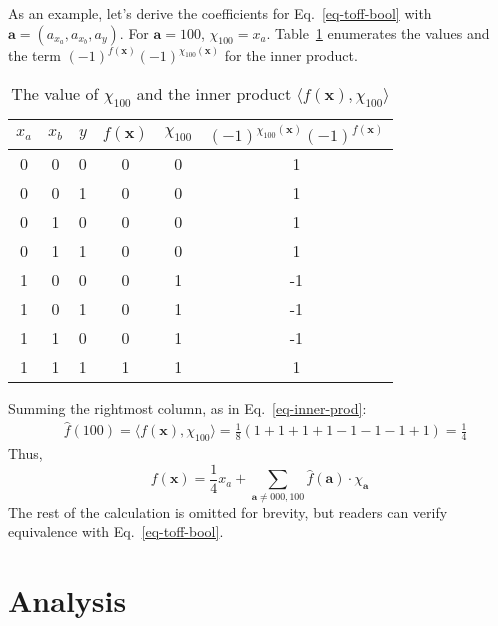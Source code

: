 \documentclass[a4paper]{article}
\begin{document}
\begin{example}
As an example, let's derive the coefficients for Eq.~\ref{eq-toff-bool} with $\mathbf{a} = (a_{x_a}, a_{x_b}, a_y)$.
For $\mathbf{a} = 100$, $\chi_{100} = x_a$. Table~\ref{table-ex-100} enumerates the values and the term $(-1)^{f(\mathbf{x})} (-1)^{\chi_{100}(\mathbf{x})}$ for the inner product.
\begin{table}[h]
  \begin{center}
    \begin{tabular}{c|c|c|c|c|c}
      \hline
      $x_a$ & $x_b$ & $y$ & $f(\mathbf{x})$ & $\chi_{100}$ & $(-1)^{\chi_{100}(\mathbf{x})} (-1)^{f(\mathbf{x})}$ \\\hline
      0 & 0 & 0 & 0 & 0 & 1\\\hline
      0 & 0 & 1 & 0 & 0 & 1\\\hline
      0 & 1 & 0 & 0 & 0 & 1\\\hline
      0 & 1 & 1 & 0 & 0 & 1\\\hline
      1 & 0 & 0 & 0 & 1 & -1\\\hline
      1 & 0 & 1 & 0 & 1 & -1\\\hline
      1 & 1 & 0 & 0 & 1 & -1\\\hline      
      1 & 1 & 1 & 1 & 1 & 1\\\hline
    \end{tabular}
    \caption{The value of $\chi_{100}$ and the inner product $\langle f(\mathbf{x}), \chi_{100} \rangle$}
    \label{table-ex-100}
  \end{center}
\end{table}

Summing the rightmost column, as in Eq.~\ref{eq-inner-prod}:
\begin{align}
    &\hat{f}(100) = \langle f(\mathbf{x}), \chi_{100} \rangle = \frac{1}{8} ( 1 + 1 + 1 + 1 - 1 - 1 - 1 + 1 ) = \frac{1}{4}
\end{align}
Thus,
\begin{equation}
  f(\mathbf{x}) = \frac{1}{4}x_a + \sum_{\mathbf{a} \neq 000,100} \hat{f}(\mathbf{a}) \cdot \chi_{\mathbf{a}}
\end{equation}
The rest of the calculation is omitted for brevity, but readers can verify equivalence with Eq.~\ref{eq-toff-bool}.
\end{example}

\vspace{0.4cm}

\section{Analysis}
\end{document}
